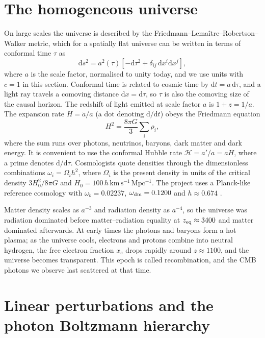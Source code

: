 \documentclass[11pt,a4paper]{article}
\newcommand{\dd}{\mathrm{d}}
\begin{document}
\section{The homogeneous universe}
\label{sec:background}

On large scales the universe is described by the Friedmann--Lema\^itre--Robertson--Walker metric, which for a spatially flat universe can be written in terms of conformal time $\tau$ as
\begin{equation}
\dd s^2 = a^2(\tau)\left[-\dd\tau^2 + \delta_{ij}\,\dd x^i \dd x^j\right],
\end{equation}
where $a$ is the scale factor, normalised to unity today, and we use units with $c=1$ in this section. Conformal time is related to cosmic time by $\dd t = a\,\dd\tau$, and a light ray travels a comoving distance $\dd x = \dd\tau$, so $\tau$ is also the comoving size of the causal horizon. The redshift of light emitted at scale factor $a$ is $1+z = 1/a$. The expansion rate $H = \dot a/a$ (a dot denoting $\dd/\dd t$) obeys the Friedmann equation
\begin{equation}
H^2 = \frac{8\pi G}{3}\sum_i \rho_i ,
\end{equation}
where the sum runs over photons, neutrinos, baryons, dark matter and dark energy. It is convenient to use the conformal Hubble rate $\mathcal{H} = a'/a = aH$, where a prime denotes $\dd/\dd\tau$. Cosmologists quote densities through the dimensionless combinations $\omega_i = \Omega_i h^2$, where $\Omega_i$ is the present density in units of the critical density $3H_0^2/8\pi G$ and $H_0 = 100\,h\,\mathrm{km\,s^{-1}\,Mpc^{-1}}$. The project uses a Planck-like reference cosmology with $\omega_b = 0.02237$, $\omega_{\rm dm} = 0.1200$ and $h \approx 0.674$ \citep{Planck2018}.

Matter density scales as $a^{-3}$ and radiation density as $a^{-4}$, so the universe was radiation dominated before matter--radiation equality at $z_{\rm eq}\approx 3400$ and matter dominated afterwards. At early times the photons and baryons form a hot plasma; as the universe cools, electrons and protons combine into neutral hydrogen, the free electron fraction $x_e$ drops rapidly around $z\approx 1100$, and the universe becomes transparent. This epoch is called recombination, and the CMB photons we observe last scattered at that time.

\section{Linear perturbations and the photon Boltzmann hierarchy}
\label{sec:perturbations}
\end{document}
